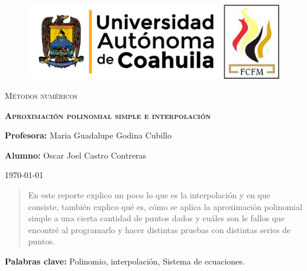 \documentclass[12pt]{article}
\begin{document}
		
		\begin{titlepage}
		
			\centering
			{\bfseries
			\begin{figure}[h!]
				\centering
				\includegraphics[width=\linewidth]{Nom_UAdeC_FCFM.png} 				
			\end{figure}
			\par}
			\vspace{2cm}
			{\scshape\LARGE Métodos numéricos \par}
			\vspace{3cm}
			{\scshape\Huge \textbf{Aproximación polinomial simple e interpolación} \par}
			\vfill
			{\LARGE \textbf{Profesora:} Maria Guadalupe Godina Cubillo \par}
			\vspace{3cm}
			{\LARGE \textbf{Alumno:} Oscar Joel Castro Contreras \par}
			\vfill
			{\Large \today \par}
			\thispagestyle{empty}
			
		\end{titlepage}
	
		\newpage

		\begin{abstract}
			\noindent En este reporte explico un poco lo que es la interpolación y en que consiste, también explico qué es, 
			cómo se aplica la aproximación polinomial simple a una cierta cantidad de puntos dados y cuáles son le fallos 
			que encontré al programarlo y hacer distintas pruebas con distintas series de puntos.
		\end{abstract}

		\textbf{Palabras clave:} Polinomio, interpolación, Sistema de ecuaciones.
\end{document}
